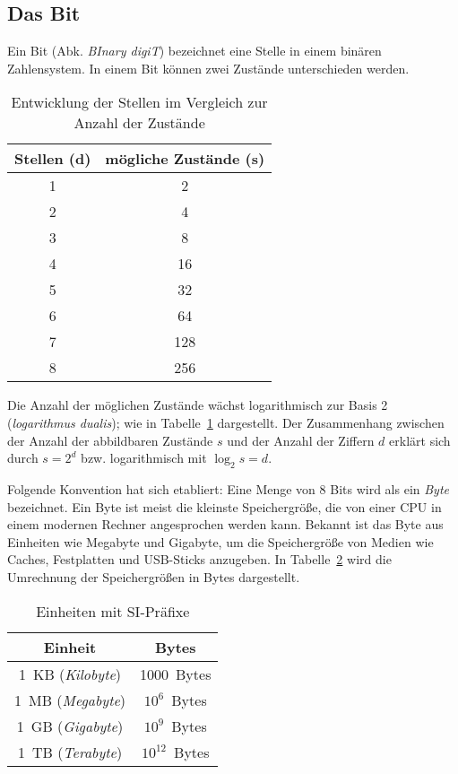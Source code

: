 \subsection{Das Bit}
%
Ein Bit (Abk. \emph{BInary digiT}) bezeichnet eine Stelle in einem
binären Zahlensystem. In einem Bit können zwei Zustände unterschieden werden.
%
\begin{table}[ht]
  \begin{center}
    \begin{tabular}{cc}
     \hline
      Stellen (d) & mögliche Zustände (s) \\
     \hline \hline
           1      &       2    \\
           2      &       4    \\
           3      &       8    \\
           4      &      16    \\
           5      &      32    \\
           6      &      64    \\
           7      &     128    \\
           8      &     256    \\
     \hline
    \end{tabular}
    \caption{Entwicklung der Stellen im Vergleich zur Anzahl der Zustände}
    \label{tab:digits_states}
  \end{center}
\end{table}
%
Die Anzahl der möglichen Zustände wächst logarithmisch zur Basis 2
(\emph{logarithmus dualis}); wie in Tabelle~\ref{tab:digits_states}
dargestellt. Der Zusammenhang zwischen der Anzahl der abbildbaren
Zustände $s$ und der Anzahl der Ziffern $d$ erklärt sich durch
$s = 2^d$ bzw. logarithmisch mit $\log_2{s} = d$.

Folgende Konvention hat sich etabliert:
Eine Menge von 8 Bits wird als ein \emph{Byte} bezeichnet.
Ein Byte ist meist die kleinste Speichergröße, die
von einer CPU in einem modernen Rechner angesprochen werden kann.
Bekannt ist das Byte aus Einheiten wie Megabyte und Gigabyte, um
die Speichergröße von Medien wie Caches, Festplatten und USB-Sticks
anzugeben. In Tabelle~\ref{tab:si_units} wird die Umrechnung der
Speichergrößen in Bytes dargestellt.
%
\begin{table}[ht]
  \begin{center}
     \begin{tabular}{cc}
      \hline
       Einheit                 & Bytes \\
      \hline \hline
       1~KB (\emph{Kilobyte})  & 1000~Bytes \\
       1~MB (\emph{Megabyte})  & $10^6$~Bytes \\
       1~GB (\emph{Gigabyte})  & $10^9$~Bytes \\
       1~TB (\emph{Terabyte})  & $10^{12}$~Bytes \\
      \hline
     \end{tabular}
     \caption{Einheiten mit SI-Präfixe}
     \label{tab:si_units}
  \end{center}
\end{table}

